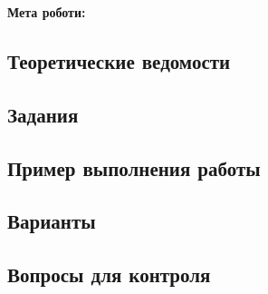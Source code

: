 \chapter{~} \label{chapt9}%
\textbf{Мета роботи:}%
%
\section{Теоретические ведомости} \label{sect9_a}
%
\section{Задания}\label{sect9_b}
%
\section{Пример выполнения работы}\label{sect9_c}
%
\section{Варианты}\label{sect9_d}
%
\section{Вопросы для контроля}\label{sect9_e}
%

